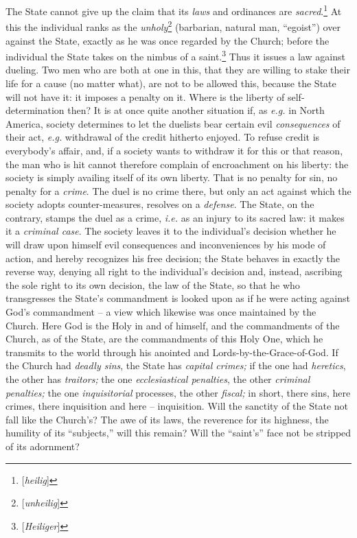 The State cannot give up the claim that its \textit{laws} and ordinances are 
\textit{sacred}.\footnote{[\textit{heilig}]} At this the individual ranks as 
the \textit{unholy}\footnote{[\textit{unheilig}]} (barbarian, natural man, 
``egoist'') over against the State, exactly as he was once regarded by the 
Church; before the individual the State takes on the nimbus of a 
saint.\footnote{[\textit{Heiliger}]} Thus it issues a law against dueling. Two 
men who are both at one in this, that they are willing to stake their life for 
a cause (no matter what), are not to be allowed this, because the State will 
not have it: it imposes a penalty on it. Where is the liberty of 
self-determination then? It is at once quite another situation if, as 
\textit{e.g.} in North America, society determines to let the duelists bear 
certain evil \textit{consequences} of their act, \textit{e.g.} withdrawal of 
the credit hitherto enjoyed. To refuse credit is everybody's affair, and, if a 
society wants to withdraw it for this or that reason, the man who is hit 
cannot therefore complain of encroachment on his liberty: the society is 
simply availing itself of its own liberty. That is no penalty for sin, no 
penalty for a \textit{crime}. The duel is no crime there, but only an act 
against which the society adopts counter-measures, resolves on a 
\textit{defense}. The State, on the contrary, stamps the duel as a crime, 
\textit{i.e.} as an injury to its sacred law: it makes it a \textit{criminal 
case}. The society leaves it to the individual's decision whether he will draw 
upon himself evil consequences and inconveniences by his mode of action, and 
hereby recognizes his free decision; the State behaves in exactly the reverse 
way, denying all right to the individual's decision and, instead, ascribing 
the sole right to its own decision, the law of the State, so that he who 
transgresses the State's commandment is looked upon as if he were acting 
against God's commandment -- a view which likewise was once maintained by the 
Church. Here God is the Holy in and of himself, and the commandments of the 
Church, as of the State, are the commandments of this Holy One, which he 
transmits to the world through his anointed and Lords-by-the-Grace-of-God. If 
the Church had \textit{deadly sins}, the State has \textit{capital crimes;} if 
the one had \textit{heretics}, the other has \textit{traitors;} the one 
\textit{ecclesiastical penalties}, the other \textit{criminal penalties;} the 
one \textit{inquisitorial} processes, the other \textit{fiscal;} in short, 
there sins, here crimes, there inquisition and here -- inquisition. Will the 
sanctity of the State not fall like the Church's? The awe of its laws, the 
reverence for its highness, the humility of its ``subjects,'' will this 
remain? Will the ``saint's'' face not be stripped of its adornment?

